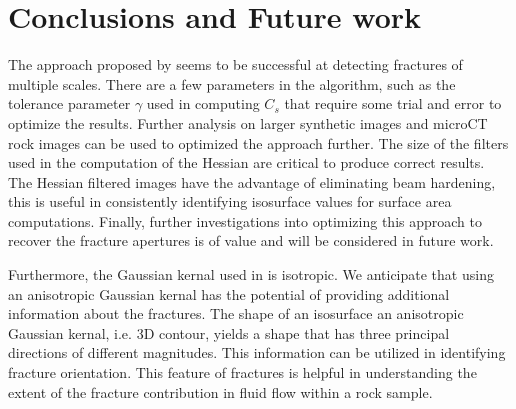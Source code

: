 \documentclass{edger}
\begin{document}
\section{Conclusions and Future work}
The approach proposed by \cite{Voorn2013} seems to be successful at detecting fractures of multiple scales. There are a few parameters in the algorithm, such as the tolerance parameter $\gamma$ used in computing $C_s$ that require some trial and error to optimize the results. Further analysis on larger synthetic images and microCT rock images can be used to optimized the approach further. The size of the filters used in the computation of the Hessian are critical to produce correct results. The Hessian filtered images have the advantage of eliminating beam hardening, this is useful in consistently identifying isosurface values for surface area computations. Finally, further investigations into optimizing this approach to recover the fracture apertures is of value and will be considered in future work.

Furthermore, the Gaussian kernal used in \cite{Voorn2013} is isotropic. We anticipate that using an anisotropic Gaussian kernal has the potential of providing additional information about the fractures. The shape of an isosurface an anisotropic Gaussian kernal, i.e. 3D contour, yields a shape that has three principal directions of different magnitudes. This information can be utilized in identifying fracture orientation. This feature of fractures is helpful in understanding the extent of the fracture contribution in fluid flow within a rock sample. 


\clearpage
\newpage


\end{document}
